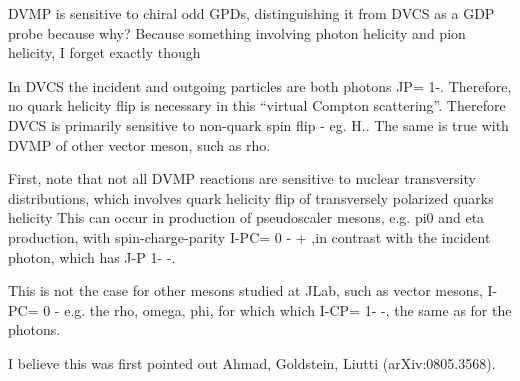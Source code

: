         DVMP is sensitive to chiral odd GPDs, distinguishing it from DVCS as a GDP probe because why? Because something involving photon helicity and pion helicity, I forget exactly though


            In DVCS the  incident and  outgoing particles are both photons JP= 1-. Therefore, no quark helicity flip is necessary in this “virtual Compton scattering”.  Therefore DVCS is primarily sensitive to non-quark spin flip - eg. H.. The same is true with DVMP of other vector meson, such as rho.
            
    
            First, note that not all DVMP reactions are sensitive to nuclear transversity distributions, which involves quark helicity flip of transversely polarized quarks helicity  This can occur in  production of pseudoscaler mesons,  e.g. pi0 and eta production, with spin-charge-parity  I-PC= 0 - + ,in contrast with  the incident photon, which  has J-P 1- -. 
            
            This is not the case for other mesons studied at JLab, such as vector mesons, I-PC= 0 - e.g. the rho, omega, phi, for which which I-CP= 1- -, the same as for the photons.   
            
            I believe this was first  pointed out  Ahmad, Goldstein, Liutti (arXiv:0805.3568). 

            
            
    \fi
    




